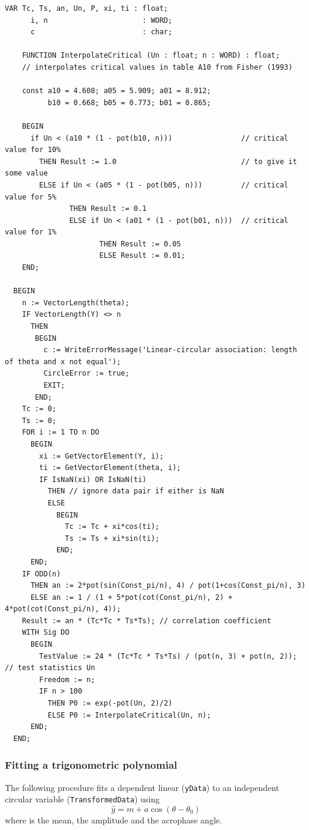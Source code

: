 \begin{refsection}
\begin{lstlisting}[caption=C-association between linear and circular data]
  VAR Tc, Ts, an, Un, P, xi, ti : float;
      i, n                      : WORD;
      c                         : char;

    FUNCTION InterpolateCritical (Un : float; n : WORD) : float;
    // interpolates critical values in table A10 from Fisher (1993)

    const a10 = 4.608; a05 = 5.909; a01 = 8.912;
          b10 = 0.668; b05 = 0.773; b01 = 0.865;

    BEGIN
      if Un < (a10 * (1 - pot(b10, n)))                // critical value for 10%
        THEN Result := 1.0                             // to give it some value
        ELSE if Un < (a05 * (1 - pot(b05, n)))         // critical value for 5%
               THEN Result := 0.1
               ELSE if Un < (a01 * (1 - pot(b01, n)))  // critical value for 1%
                      THEN Result := 0.05
                      ELSE Result := 0.01;
    END;

  BEGIN
    n := VectorLength(theta);
    IF VectorLength(Y) <> n
      THEN
       BEGIN
         c := WriteErrorMessage('Linear-circular association: length of theta and x not equal');
         CircleError := true;
         EXIT;
       END;
    Tc := 0;
    Ts := 0;
    FOR i := 1 TO n DO
      BEGIN
        xi := GetVectorElement(Y, i);
        ti := GetVectorElement(theta, i);
        IF IsNaN(xi) OR IsNaN(ti)
          THEN // ignore data pair if either is NaN
          ELSE
            BEGIN
              Tc := Tc + xi*cos(ti);
              Ts := Ts + xi*sin(ti);
            END;
      END;
    IF ODD(n)
      THEN an := 2*pot(sin(Const_pi/n), 4) / pot(1+cos(Const_pi/n), 3)
      ELSE an := 1 / (1 + 5*pot(cot(Const_pi/n), 2) + 4*pot(cot(Const_pi/n), 4));
    Result := an * (Tc*Tc * Ts*Ts); // correlation coefficient
    WITH Sig DO
      BEGIN
        TestValue := 24 * (Tc*Tc * Ts*Ts) / (pot(n, 3) + pot(n, 2)); // test statistics Un
        Freedom := n;
        IF n > 100
          THEN P0 := exp(-pot(Un, 2)/2)
          ELSE P0 := InterpolateCritical(Un, n);
      END;
  END;
\end{lstlisting}

\subsubsection{Fitting a trigonometric polynomial}

The following procedure fits a dependent linear (\texttt{yData}) to an independent circular variable (\texttt{TransformedData}) using
\begin{equation}
  \hat{y} = m + a \cos(\theta - \theta_0)
\end{equation}
where  is the mean,  the amplitude and  the acrophase angle.


\end{refsection}
